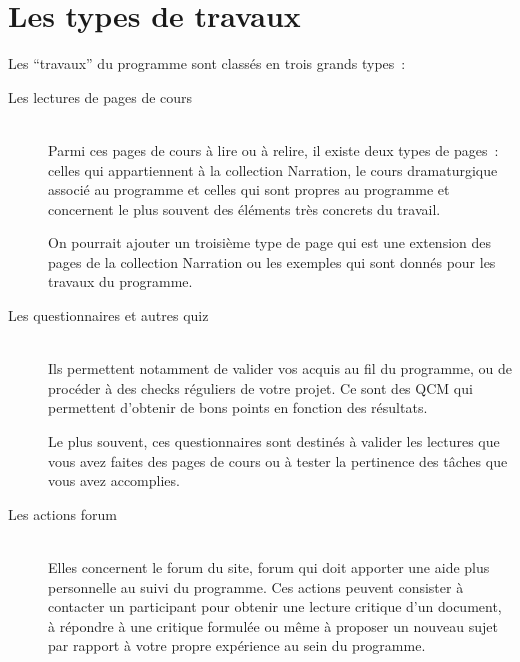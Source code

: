% 
% 
% 
% 
% 
% 
% 
% 

\section{Les types de travaux}\hypertarget{type-travaux}{}\label{type-travaux}

Les “travaux” du programme \unan{} sont classés en trois grands types~{}:

\begin{description}
\item[Les lectures de pages de cours] \hfill \\
 Parmi ces pages de cours à lire ou à relire, il existe deux types de pages~{}:  celles qui appartiennent à la collection Narration, le cours dramaturgique associé au programme et celles qui sont propres au programme et concernent le plus souvent des éléments très concrets du travail.



On pourrait ajouter un troisième type de page qui est une extension des pages de la collection Narration ou les exemples qui sont donnés pour les travaux du programme.



\item[Les questionnaires et autres quiz] \hfill \\
 Ils permettent notamment de valider vos acquis au fil du programme, ou de procéder à des checks réguliers de votre projet. Ce sont des QCM qui permettent d'obtenir de bons points en fonction des résultats.



Le plus souvent, ces questionnaires sont destinés à valider les lectures que vous avez faites des pages de cours ou à tester la pertinence des tâches que vous avez accomplies.



\item[Les actions forum] \hfill \\
 Elles concernent le forum du site, forum qui doit apporter une aide plus personnelle au suivi du programme. Ces actions peuvent consister à contacter un participant pour obtenir une lecture critique d'un document, à répondre à une critique formulée ou même à proposer un nouveau sujet par rapport à votre propre expérience au sein du programme.




\end{description}
